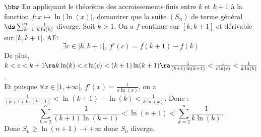 \documentclass[11pt]{article}
\begin{document}
\begin{exercice}{$\bbw$}{}
    En appliquant le théorème des accroissements finis entre $k$ et $k+1$ à la fonction $f:x\mapsto \ln|\ln(x)|$, demontrer que la suite $(S_n)$ de terme général $\ds\sum_{k=1}^n\frac{1}{k\ln(k)}$ diverge.
    \tcblower
    Soit $k>1$. On a $f$ continue sur $[k,k+1]$ et dérivable sur $]k,k+1[$. AF:
    \begin{equation*}
        \exists c \in ]k,k+1[, ~ f'(c)=f(k+1)-f(k)
    \end{equation*}
    De plus, $k<c<k+1\ra k\ln(k)<c\ln(c)<(k+1)\ln(k+1)\ra\frac{1}{(k+1)\ln(k+1)}<\frac{1}{c\ln(c)}<\frac{1}{k\ln(k)}$.\\
    Et puisque $\forall x \in ]1,+\infty[, ~ f'(x)=\frac{1}{x\ln(x)}$, on a $\frac{1}{(k+1)\ln(k+1)}<\ln(k+1)-\ln(k)<\frac{1}{k\ln(k)}$. Donc :
    \begin{equation*}
        \sum_{k=2}^n\frac{1}{(k+1)\ln(k+1)}<\ln(n+1)<\sum_{k=2}^n\frac{1}{k\ln(k)}.
    \end{equation*}
    Donc $S_n\geq\ln(n+1)\to+\infty$ donc $S_n$ diverge.
\end{exercice}

\vspace*{0.4cm}
\end{document}
